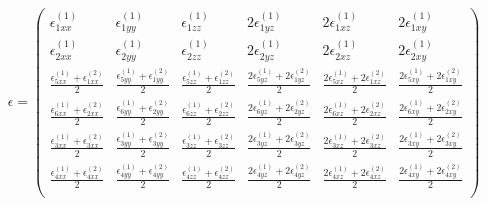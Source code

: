 \begin{equation}
\epsilon  =\begin{pmatrix}
\epsilon_{1xx}^{\left(1\right)}&\epsilon_{1yy}^{\left(1\right)}&\epsilon_{1zz}^{\left(1\right)}&2\epsilon_{1yz}^{\left(1\right)}&2\epsilon_{1xz}^{\left(1\right)}&2\epsilon_{1xy}^{\left(1\right)} \\

\epsilon_{2xx}^{\left(1\right)}&\epsilon_{2yy}^{\left(1\right)}&\epsilon_{2zz}^{\left(1\right)}&2\epsilon_{2yz}^{\left(1\right)}&2\epsilon_{2xz}^{\left(1\right)}&2\epsilon_{2xy}^{\left(1\right)} \\

\frac{\epsilon_{5xx}^{\left(1\right)}+\epsilon_{1xx}^{\left(2\right)}}{2}&\frac{\epsilon_{5yy}^{\left(1\right)}+\epsilon_{1yy}^{\left(2\right)}}{2}&\frac{\epsilon_{5zz}^{\left(1\right)}+\epsilon_{1zz}^{\left(2\right)}}{2}&\frac{2\epsilon_{5yz}^{\left(1\right)}+2\epsilon_{1yz}^{\left(2\right)}}{2}&\frac{2\epsilon_{5xz}^{\left(1\right)}+2\epsilon_{1xz}^{\left(2\right)}}{2}&\frac{2\epsilon_{5xy}^{\left(1\right)}+2\epsilon_{1xy}^{\left(2\right)}}{2}  \\

\frac{\epsilon_{6xx}^{\left(1\right)}+\epsilon_{2xx}^{\left(2\right)}}{2}&\frac{\epsilon_{6yy}^{\left(1\right)}+\epsilon_{2yy}^{\left(2\right)}}{2}&\frac{\epsilon_{6zz}^{\left(1\right)}+\epsilon_{2zz}^{\left(2\right)}}{2}&\frac{2\epsilon_{6yz}^{\left(1\right)}+2\epsilon_{2yz}^{\left(2\right)}}{2}&\frac{2\epsilon_{6xz}^{\left(1\right)}+2\epsilon_{2xz}^{\left(2\right)}}{2}&\frac{2\epsilon_{6xy}^{\left(1\right)}+2\epsilon_{2xy}^{\left(2\right)}}{2} \\

\frac{\epsilon_{3xx}^{\left(1\right)}+\epsilon_{3xx}^{\left(2\right)}}{2}&\frac{\epsilon_{3yy}^{\left(1\right)}+\epsilon_{3yy}^{\left(2\right)}}{2}&\frac{\epsilon_{3zz}^{\left(1\right)}+\epsilon_{3zz}^{\left(2\right)}}{2}&\frac{2\epsilon_{3yz}^{\left(1\right)}+2\epsilon_{3yz}^{\left(2\right)}}{2}&\frac{2\epsilon_{3xz}^{\left(1\right)}+2\epsilon_{3xz}^{\left(2\right)}}{2}&\frac{2\epsilon_{3xy}^{\left(1\right)}+2\epsilon_{3xy}^{\left(2\right)}}{2} \\

\frac{\epsilon_{4xx}^{\left(1\right)}+\epsilon_{4xx}^{\left(2\right)}}{2}&\frac{\epsilon_{4yy}^{\left(1\right)}+\epsilon_{4yy}^{\left(2\right)}}{2}&\frac{\epsilon_{4zz}^{\left(1\right)}+\epsilon_{4zz}^{\left(2\right)}}{2}&\frac{2\epsilon_{4yz}^{\left(1\right)}+2\epsilon_{4yz}^{\left(2\right)}}{2}&\frac{2\epsilon_{4xz}^{\left(1\right)}+2\epsilon_{4xz}^{\left(2\right)}}{2}&\frac{2\epsilon_{4xy}^{\left(1\right)}+2\epsilon_{4xy}^{\left(2\right)}}{2} \\


\end{pmatrix}
\end{equation}
